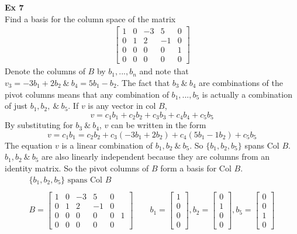 \documentclass{article}
\begin{document}
  \textbf{Ex 7}\\
  Find a basis for the column space of the matrix
  \[
    \begin{gathered}
    \begin{bmatrix}
      1 &0 &-3 &5 &0\\
      0 &1 &2 &-1 &0\\
      0 &0 &0 &0 &1\\
      0 &0 &0 &0 &0
    \end{bmatrix}
    \end{gathered}
  \]
  Denote the columns of $ B $ by $ b_1,...,b_n $ and note that $ v_3=-3b_1+2b_2 ~\&~ b_4=5b_1-b_2$. The fact that $ b_3 ~\&~ b_4$ are combinations of the pivot columns means that any combination of $ b_1,...,b_5 $ is actually a combination of just $ b_1,b_2,~\&~ b_5 $. If $ v $ is any vector in col $ B $,
  \[
    v=c_1b_1+c_2b_2+c_3b_3+c_4b_4+c_5b_5
  \]
  By substituting for $ b_3 ~\&~ b_4 $, $ v $ can be written in the form
  \[
    v=c_1b_1=c_2b_2+c_3(-3b_1+2b_2)+c_4(5b_1-1b_2)+c_5b_5
  \]
  The equation $ v $ is a linear combination of $ b_1,b_2 ~\&~ b_5 $. So $ \{ b_1,b_2,b_5 \} $ spans Col $ B $. $ b_1,b_2 ~\&~ b_5 $ are also linearly independent because they are columns from an identity matrix. So the pivot columns of $ B $ form a basis for Col $ B $.
  \[
    \begin{gathered}
    \{ b_1 ,b_2,b_5 \} \text{ spans Col } B\\
    ~\\
    B= \begin{bmatrix}
      1 &0 &-3 &5 &0\\
      0 &1 &2 &-1 &0\\
      0 &0 &0 &0 &0 &1\\
      0 &0 &0 &0 &0
    \end{bmatrix} \qquad
    b_1 = \begin{bmatrix}
      1\\
      0\\
      0\\
      0
    \end{bmatrix}, b_2=
    \begin{bmatrix}
      0\\
      1\\
      0\\
      0
    \end{bmatrix}, b_5=
    \begin{bmatrix}
      0\\
      0\\
      1\\
      0
    \end{bmatrix}
    \end{gathered}
  \]
\end{document}
